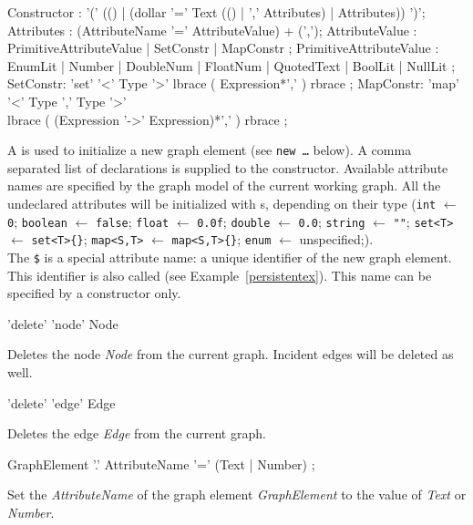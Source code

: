 \begin{rail}
  Constructor : '(' (() | (dollar '=' Text (() | ',' Attributes) | Attributes)) ')';
  Attributes : (AttributeName '=' AttributeValue) + (',');
  AttributeValue :  PrimitiveAttributeValue | SetConstr | MapConstr ;
  PrimitiveAttributeValue : EnumLit | Number | DoubleNum | FloatNum | QuotedText | BoolLit | NullLit ;
  SetConstr: 'set' '<' Type '>' lbrace ( Expression*',' ) rbrace ;
  MapConstr: 'map' '<' Type ',' Type '>' \\ lbrace ( (Expression '->' Expression)*',' ) rbrace ;
\end{rail}\indexmain{\texttt{\$}}
A  is used to initialize a new graph element (see \texttt{new \dots} below).
A comma separated list of  declarations is supplied to the constructor.
Available attribute names are specified by the graph model of the current working graph.
All the undeclared attributes will be initialized with s, depending on their type 
(\texttt{int} $\leftarrow$ \texttt{0}; \texttt{boolean} $\leftarrow$ \texttt{false}; \texttt{float} $\leftarrow$ \texttt{0.0f}; \texttt{double} $\leftarrow$ \texttt{0.0}; \texttt{string} $\leftarrow$ \texttt{""}; \texttt{set<T>} $\leftarrow$ \texttt{set<T>\{\}}; \texttt{map<S,T>} $\leftarrow$ \texttt{map<S,T>\{\}}; \texttt{enum} $\leftarrow$ unspecified;).\\
The \texttt{\$} is a special attribute name: a unique identifier of the new graph element.
This identifier is also called  (see Example~\ref{persistentex}).
This name can be specified by a constructor only.

\begin{rail}
  'delete' 'node' Node
\end{rail}
Deletes the node \emph{Node} from the current graph.
Incident edges will be deleted as well.

\begin{rail}
  'delete' 'edge' Edge
\end{rail}
Deletes the edge \emph{Edge} from the current graph.

\begin{rail}
  GraphElement '.' AttributeName '=' (Text | Number) ;
\end{rail}
Set the  \emph{AttributeName} of the graph element \emph{GraphElement} to the value of \emph{Text} or \emph{Number}.

